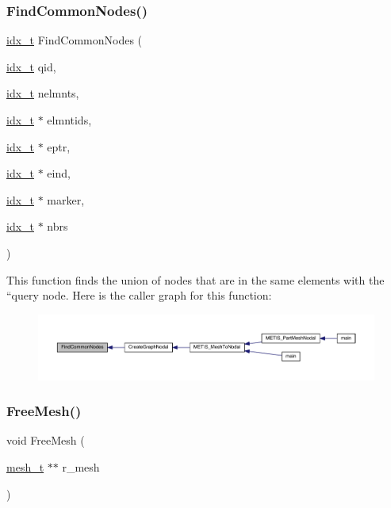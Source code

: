 \subsubsection{\texorpdfstring{Find\+Common\+Nodes()}{FindCommonNodes()}}
{\footnotesize\ttfamily \hyperlink{a00876_aaa5262be3e700770163401acb0150f52}{idx\+\_\+t} Find\+Common\+Nodes (\begin{DoxyParamCaption}\item[{\hyperlink{a00876_aaa5262be3e700770163401acb0150f52}{idx\+\_\+t}}]{qid,  }\item[{\hyperlink{a00876_aaa5262be3e700770163401acb0150f52}{idx\+\_\+t}}]{nelmnts,  }\item[{\hyperlink{a00876_aaa5262be3e700770163401acb0150f52}{idx\+\_\+t} $\ast$}]{elmntids,  }\item[{\hyperlink{a00876_aaa5262be3e700770163401acb0150f52}{idx\+\_\+t} $\ast$}]{eptr,  }\item[{\hyperlink{a00876_aaa5262be3e700770163401acb0150f52}{idx\+\_\+t} $\ast$}]{eind,  }\item[{\hyperlink{a00876_aaa5262be3e700770163401acb0150f52}{idx\+\_\+t} $\ast$}]{marker,  }\item[{\hyperlink{a00876_aaa5262be3e700770163401acb0150f52}{idx\+\_\+t} $\ast$}]{nbrs }\end{DoxyParamCaption})}

This function finds the union of nodes that are in the same elements with the ``query\textquotesingle{}\textquotesingle{} node. Here is the caller graph for this function\+:\nopagebreak
\begin{figure}[H]
\begin{center}
\leavevmode
\includegraphics[width=350pt]{a00927_aa3fb3adf98a0168ead1ff715114ebea1_icgraph}
\end{center}
\end{figure}
\mbox{\label{a00927_af62123ffaba6a345198b3ec100bd9e18}} 
\subsubsection{\texorpdfstring{Free\+Mesh()}{FreeMesh()}}
{\footnotesize\ttfamily void Free\+Mesh (\begin{DoxyParamCaption}\item[{\hyperlink{a00738}{mesh\+\_\+t} $\ast$$\ast$}]{r\+\_\+mesh }\end{DoxyParamCaption})}

